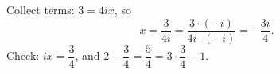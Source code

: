 Collect terms: $3=4ix$, so
\[x=\dfrac{3}{4i}=\dfrac{3\cdot(-i)}{4i\cdot(-i)}=\boxed{-\dfrac{3i}{4}}.\]
Check: $ix=\dfrac{3}{4}$, and $2-\dfrac{3}{4}=\dfrac{5}{4}=3\cdot\dfrac{3}{4}-1$.
